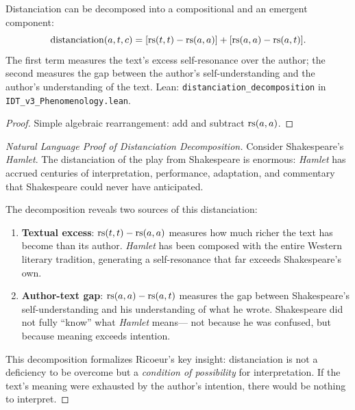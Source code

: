 \begin{theorem}
\label{thm:distanciation-decomp}
Distanciation can be decomposed into a compositional and an emergent component:
\[
\mathrm{distanciation}(a, t, c) = [\mathrm{rs}(t, t) - \mathrm{rs}(a, a)] + [\mathrm{rs}(a, a) - \mathrm{rs}(a, t)].
\]
The first term measures the text's excess self-resonance over the author;
the second measures the gap between the author's self-understanding and the
author's understanding of the text.
Lean: \texttt{distanciation\_decomposition} in \texttt{IDT\_v3\_Phenomenology.lean}.
\end{theorem}

\begin{proof}
Simple algebraic rearrangement: add and subtract $\mathrm{rs}(a, a)$.
\end{proof}

\begin{proof}[Natural Language Proof of Distanciation Decomposition]
Consider Shakespeare's \textit{Hamlet}.  The distanciation of the play from
Shakespeare is enormous: \textit{Hamlet} has accrued centuries of interpretation,
performance, adaptation, and commentary that Shakespeare could never have
anticipated.

The decomposition reveals two sources of this distanciation:
\begin{enumerate}
\item \textbf{Textual excess}: $\mathrm{rs}(t, t) - \mathrm{rs}(a, a)$ measures how much
richer the text has become than its author.  \textit{Hamlet} has been
composed with the entire Western literary tradition, generating a
self-resonance that far exceeds Shakespeare's own.

\item \textbf{Author-text gap}: $\mathrm{rs}(a, a) - \mathrm{rs}(a, t)$ measures the gap
between Shakespeare's self-understanding and his understanding of what he
wrote.  Shakespeare did not fully ``know'' what \textit{Hamlet} means---
not because he was confused, but because meaning exceeds intention.
\end{enumerate}

This decomposition formalizes Ricoeur's key insight: distanciation is not a
deficiency to be overcome but a \emph{condition of possibility} for
interpretation.  If the text's meaning were exhausted by the author's
intention, there would be nothing to interpret.
\end{proof}

